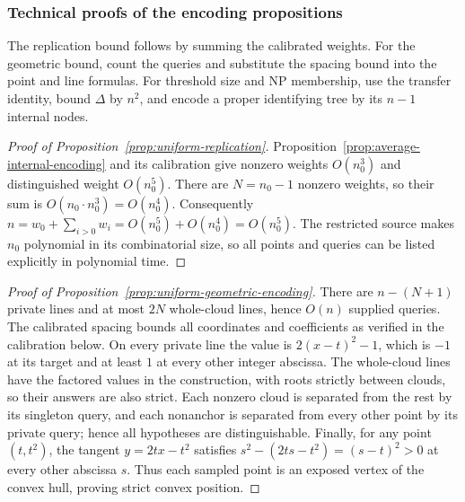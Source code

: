 \subsubsection{Technical proofs of the encoding propositions}

\begin{proofstrategy}
The replication bound follows by summing the calibrated weights.
For the geometric bound, count the queries and substitute the spacing
bound into the point and line formulas. For threshold size and NP
membership, use the transfer identity, bound $\Delta$ by $n^2$, and
encode a proper identifying tree by its $n-1$ internal nodes.
\end{proofstrategy}

\begin{proof}[Proof of Proposition~\ref{prop:uniform-replication}]
Proposition~\ref{prop:average-internal-encoding} and its calibration
give nonzero weights $O(n_0^3)$ and
distinguished weight $O(n_0^5)$. There are $N=n_0-1$ nonzero
weights, so their sum is $O(n_0\cdot n_0^3)=O(n_0^4)$.
Consequently
$n=w_0+\sum_{i>0}w_i=O(n_0^5)+O(n_0^4)=O(n_0^5)$. The restricted source makes $n_0$ polynomial
in its combinatorial size, so all points and queries can be listed
explicitly in polynomial time.
\end{proof}

\begin{proof}[Proof of Proposition~\ref{prop:uniform-geometric-encoding}]
There are $n-(N+1)$ private lines and at most $2N$ whole-cloud
lines, hence $O(n)$ supplied queries. The calibrated spacing bounds
all coordinates and coefficients as verified in the calibration
below. On every private line the value is $2(x-t)^2-1$, which is
$-1$ at its target and at least $1$ at every other integer
abscissa. The whole-cloud lines have the factored values in
the construction, with roots strictly between clouds, so their
answers are also strict. Each nonzero cloud is separated from the
rest by its singleton query, and each nonanchor is separated from
every other point by its private query; hence all hypotheses are
distinguishable. Finally, for any point $(t,t^2)$, the tangent
$y=2tx-t^2$ satisfies $s^2-(2ts-t^2)=(s-t)^2>0$ at every other
abscissa $s$. Thus each sampled point is an exposed vertex of the
convex hull, proving strict convex position.
\end{proof}

